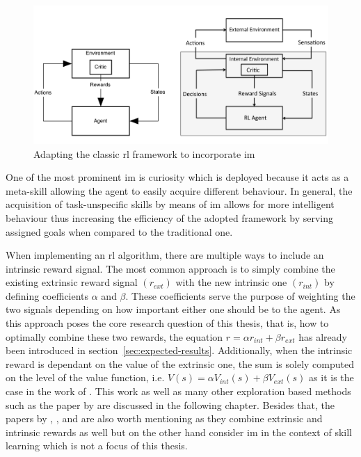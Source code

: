 \documentclass[draft,final]{vutinfth} %
\newcommand{\p}[1]{see p. #1}
\begin{document}
    \begin{figure}[h]
        \centering
        \includegraphics[width=\textwidth]{figures/adapted_rl_framework.png}
        \caption[Adapting the classic \acrlong{rl} framework to incorporate \acrlong{im}]{Adapting the classic \gls{rl} framework to incorporate \gls{im}\protect\footnotemark[4]}
        \label{fig:adapted_rl_framework}
    \end{figure}

    \footnotetext[4]{\citep[\p{2}]{singh_intrinsically_2010}}

    One of the most prominent \gls{im} is curiosity which is deployed because it acts as a meta-skill allowing the agent to easily acquire different behaviour.
    In general, the acquisition of task-unspecific skills by means of \gls{im} allows for more intelligent behaviour thus increasing the efficiency of the adopted framework by serving assigned goals when compared to the traditional one.

    When implementing an \gls{rl} algorithm, there are multiple ways to include an intrinsic reward signal.
    The most common approach is to simply combine the existing extrinsic reward signal $(r_{ext})$ with the new intrinsic one $(r_{int})$ by defining coefficients $\alpha$ and $\beta$.
    These coefficients serve the purpose of weighting the two signals depending on how important either one should be to the agent.
    As this approach poses the core research question of this thesis, that is, how to optimally combine these two rewards, the equation $r = \alpha r_{int} + \beta r_{ext}$ has already been introduced in section~\ref{sec:expected-results}.
    Additionally, when the intrinsic reward is dependant on the value of the extrinsic one, the sum is solely computed on the level of the value function, i.e. $V(s)=\alpha V_{int}(s) + \beta V_{ext}(s)$ as it is the case in the work of \citet{kim_curiosity-bottleneck_2019-1}.
    This work as well as many other exploration based methods such as the paper by \citet{burda_exploration_2018} are discussed in the following chapter.
    Besides that, the papers by \citeauthor{gregor_variational_2016}, \citeauthor{vezhnevets_feudal_2017}, and \citeauthor{huang_learning_2019} are also worth mentioning as they combine extrinsic and intrinsic rewards as well but on the other hand consider \gls{im} in the context of skill learning which is not a focus of this thesis.
\end{document}
